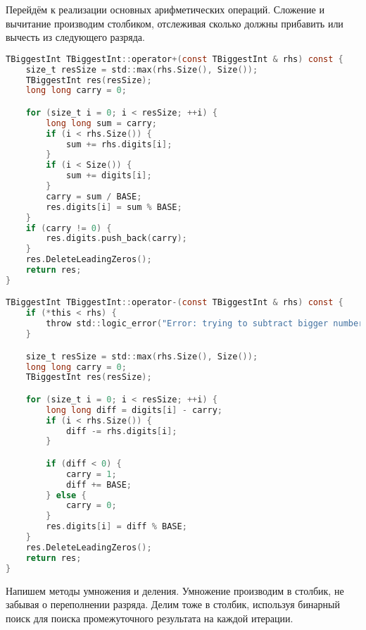 Перейдём к реализации основных арифметических операций. Сложение и вычитание производим столбиком, отслеживая сколько должны прибавить или вычесть из следующего разряда.

\begin{lstlisting}[language=C]
TBiggestInt TBiggestInt::operator+(const TBiggestInt & rhs) const {
    size_t resSize = std::max(rhs.Size(), Size());
    TBiggestInt res(resSize);
    long long carry = 0;

    for (size_t i = 0; i < resSize; ++i) {
        long long sum = carry;
        if (i < rhs.Size()) {
            sum += rhs.digits[i];
        }
        if (i < Size()) {
            sum += digits[i];
        }
        carry = sum / BASE;
        res.digits[i] = sum % BASE;
    }
    if (carry != 0) {
        res.digits.push_back(carry);
    }
    res.DeleteLeadingZeros();
    return res;
}

TBiggestInt TBiggestInt::operator-(const TBiggestInt & rhs) const {
    if (*this < rhs) {
        throw std::logic_error("Error: trying to subtract bigger number from smaller");
    }

    size_t resSize = std::max(rhs.Size(), Size());
    long long carry = 0;
    TBiggestInt res(resSize);

    for (size_t i = 0; i < resSize; ++i) {
        long long diff = digits[i] - carry;
        if (i < rhs.Size()) {
            diff -= rhs.digits[i];
        }

        if (diff < 0) {
            carry = 1;
            diff += BASE;
        } else {
            carry = 0;
        }
        res.digits[i] = diff % BASE;
    }
    res.DeleteLeadingZeros();
    return res;
}
\end{lstlisting}
\pagebreak
Напишем методы умножения и деления. Умножение производим в столбик, не забывая о переполнении разряда. Делим тоже в столбик, используя бинарный поиск для поиска промежуточного результата на каждой итерации. 

